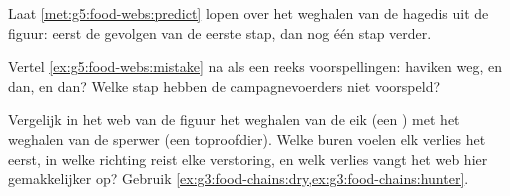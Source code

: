 \begin{exercise}[$\star\star$]\label{exo:g5:food-webs:9}
Laat \cref{met:g5:food-webs:predict} lopen over het weghalen van de
hagedis uit de figuur: eerst de gevolgen van de eerste stap, dan nog één
stap verder.
\end{exercise}

\begin{exercise}[$\star\star$]\label{exo:g5:food-webs:10}
Vertel \cref{ex:g5:food-webs:mistake} na als een reeks voorspellingen:
haviken weg, en dan, en dan? Welke stap hebben de campagnevoerders niet
voorspeld?
\end{exercise}

\begin{exercise}[$\star\star\star$]\label{exo:g5:food-webs:11}
Vergelijk in het web van de figuur het weghalen van de eik (een
) met het weghalen van de sperwer (een toproofdier). Welke
buren voelen elk verlies het eerst, in welke richting reist elke
verstoring, en welk verlies vangt het web hier gemakkelijker op? Gebruik
\cref{ex:g3:food-chains:dry,ex:g3:food-chains:hunter}.
\end{exercise}
